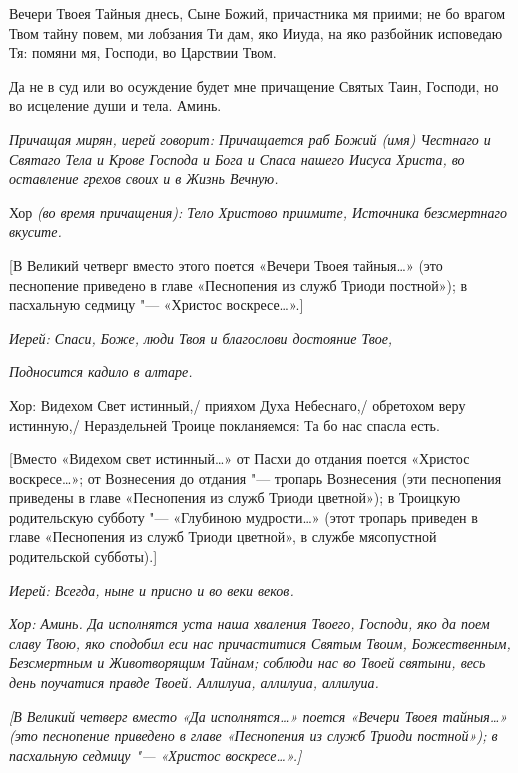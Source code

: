   Вечери Твоея Тайныя днесь, Сыне Божий, причастника мя приими; не бо врагом Твом тайну повем, ми лобзания Ти дам, яко Ииуда, на яко разбойник исповедаю Тя: помяни мя, Господи, во Царствии Твом.


  Да не в суд или во осуждение будет мне причащение Святых Таин, Господи, но во исцеление души и тела. Аминь.




\itshape  Причащая мирян, иерей говори\normalfont{}т: Причащается раб Божий (имя) Честнаго и Святаго Тела и Крове Господа и Бога и Спаса нашего Иисуса Христа, во оставление грехов своих и в Жизнь Вечную. 


Хор \itshape (во время причащения)\normalfont{}: Тело Христово приимите, Источника безсмертнаго вкусите.


 [В Великий четверг вместо этого поется «Вечери Твоея тайныя…» (это песнопение приведено в главе «Песнопения из служб Триоди постной»); в пасхальную седмицу "--- «Христос воскресе…».]


 \itshape Иерей:\normalfont{} Спаси, Боже, люди Твоя и благослови достояние Твое, 


\itshape Подносится кадило в алтаре.\normalfont{} 


      Хор: Видехом Свет истинный,/ прияхом Духа Небеснаго,/ обретохом веру истинную,/ Нераздельней Троице покланяемся: Та бо нас спасла есть.


      [Вместо «Видехом свет истинный…» от Пасхи до отдания поется «Христос воскресе…»; от Вознесения до отдания "--- тропарь Вознесения (эти песнопения приведены в главе «Песнопения из служб Триоди цветной»); в Троицкую родительскую субботу "--- «Глубиною мудрости…» (этот тропарь приведен в главе «Песнопения из служб Триоди цветной», в службе мясопустной родительской субботы).]


\itshape  Иерей:\normalfont{} Всегда, ныне и присно и во веки веков.


\itshape  Хор:\normalfont{} Аминь. Да исполнятся уста наша хваления Твоего, Господи, яко да поем славу Твою, яко сподобил еси нас причаститися Святым Твоим, Божественным, Безсмертным и Животворящим Тайнам; соблюди нас во Твоей святыни, весь день поучатися правде Твоей. Аллилуиа, аллилуиа, аллилуиа. 


\itshape [В Великий четверг вмест\normalfont{}о «Да исполнятся…» поется «Вечери Твоея тайныя…» (это песнопение приведено в главе «Песнопения из служб Триоди постной»); в пасхальную седмицу "--- «Христос воскресе…».]



